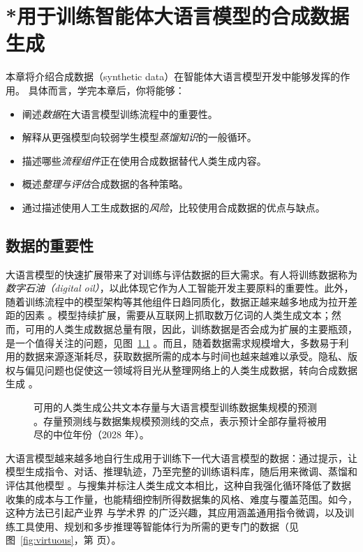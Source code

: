 \chapter[*合成数据生成]{*用于训练智能体大语言模型的合成数据生成}\label{chap:synthetic-data}


\begin{learningbox}
本章将介绍合成数据（synthetic data）在智能体大语言模型开发中能够发挥的作用。
具体而言，学完本章后，你将能够：
\begin{itemize}[leftmargin=*, nosep]
    \item 阐述{\em 数据}在大语言模型训练流程中的重要性。
    \item 解释从更强模型向较弱学生模型{\em 蒸馏知识}的一般循环。
    \item 描述哪些{\em 流程组件}正在使用合成数据替代人类生成内容。
    \item 概述{\em 整理与评估}合成数据的各种策略。
    \item 通过描述使用人工生成数据的{\em 风险}，比较使用合成数据的优点与缺点。
\end{itemize}
\end{learningbox}

\section{数据的重要性}
大语言模型的快速扩展带来了对训练与评估数据的巨大需求。有人将训练数据称为{\em 数字石油（digital oil）}，以此体现它作为人工智能开发主要原料的重要性。此外，随着训练流程中的模型架构等其他组件日趋同质化，数据正越来越多地成为拉开差距的因素 \citep{11072851}。模型持续扩展，需要从互联网上抓取数万亿词的人类生成文本；然而，可用的人类生成数据总量有限，因此，训练数据是否会成为扩展的主要瓶颈，是一个值得关注的问题，见图~\ref{fig:data-stock} \citep{villalobos2024position}。而且，随着数据需求规模增大，多数易于利用的数据来源逐渐耗尽，获取数据所需的成本与时间也越来越难以承受。隐私、版权与偏见问题也促使这一领域将目光从整理网络上的人类生成数据，转向合成数据生成 \citep{liang2022advances}。

\begin{figure}[tb]
    \centering
    
    \caption{可用的人类生成公共文本存量与大语言模型训练数据集规模的预测 \citep{villalobos2024position}。存量预测线与数据集规模预测线的交点，表示预计全部存量将被用尽的中位年份（2028 年）。}
    \label{fig:data-stock}
\end{figure}

大语言模型越来越多地自行生成用于训练下一代大语言模型的数据：通过提示，让模型生成指令、对话、推理轨迹，乃至完整的训练语料库，随后用来微调、蒸馏和评估其他模型 \citep{long-etal-2024-llms}。与搜集并标注人类生成文本相比，这种自我强化循环降低了数据收集的成本与工作量，也能精细控制所得数据集的风格、难度与覆盖范围。如今，这种方法已引起产业界 \citep{10.1145/3715275.3732005} 与学术界 \citep{viswanathan-etal-2025-synthetic, alismail2025survey} 的广泛兴趣，其应用涵盖通用指令微调，以及训练工具使用、规划和多步推理等智能体行为所需的更专门的数据（见图~\ref{fig:virtuous}，第 \pageref{fig:virtuous} 页）。

